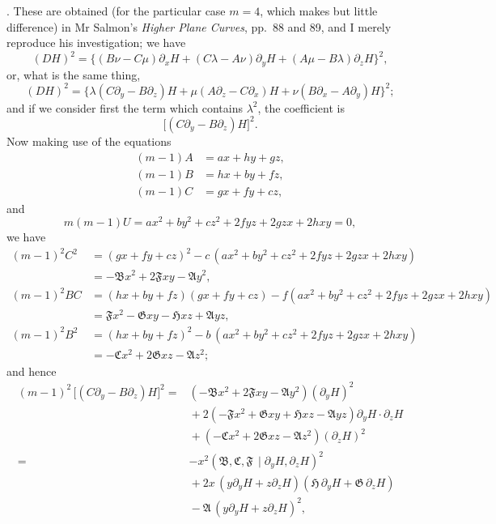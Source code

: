 \documentclass[11pt]{article}
\newcommand{\Cdel}{\mid}
\begin{document}
. These are obtained (for the particular case $m = 4$, which makes but little difference) in Mr Salmon's \textit{Higher Plane Curves}, pp.~88 and 89, and I merely reproduce his investigation; we have
\[
(DH)^2 = \bigl\{(B\nu - C\mu)\partial_x H + (C\lambda - A\nu)\partial_y H + (A\mu - B\lambda)\partial_z H\bigr\}^2,
\]
or, what is the same thing,
\[
(DH)^2 = \bigl\{\lambda(C\partial_y - B\partial_z)H + \mu(A\partial_z - C\partial_x)H + \nu(B\partial_x - A\partial_y)H\bigr\}^2;
\]
and if we consider first the term which contains $\lambda^2$, the coefficient is
\[
\bigl[(C\partial_y - B\partial_z)H\bigr]^2.
\]
Now making use of the equations
\[
\begin{aligned}
(m-1)A &= ax + hy + gz,\\
(m-1)B &= hx + by + fz,\\
(m-1)C &= gx + fy + cz,
\end{aligned}
\]
and
\[
m(m-1)U = ax^2 + by^2 + cz^2 + 2fyz + 2gzx + 2hxy = 0,
\]
we have
\[
\begin{aligned}
(m-1)^2 C^2 &= (gx + fy + cz)^2 - c\,(ax^2 + by^2 + cz^2 + 2fyz + 2gzx + 2hxy)\\
            &= -\mathfrak{B}x^2 + 2\mathfrak{F}xy - \mathfrak{A}y^2,\\[2pt]
(m-1)^2 BC &= (hx + by + fz)(gx + fy + cz) - f(ax^2 + by^2 + cz^2 + 2fyz + 2gzx + 2hxy)\\
            &= \mathfrak{F}x^2 - \mathfrak{G}xy - \mathfrak{H}xz + \mathfrak{A}yz,\\[2pt]
(m-1)^2 B^2 &= (hx + by + fz)^2 - b\,(ax^2 + by^2 + cz^2 + 2fyz + 2gzx + 2hxy)\\
            &= -\mathfrak{C}x^2 + 2\mathfrak{G}xz - \mathfrak{A}z^2;
\end{aligned}
\]
and hence
\[
\begin{aligned}
(m-1)^2\,\bigl[(C\partial_y - B\partial_z)H\bigr]^2 = {}& (-\mathfrak{B}x^2 + 2\mathfrak{F}xy - \mathfrak{A}y^2)(\partial_y H)^2\\
&{}+ 2(-\mathfrak{F}x^2 + \mathfrak{G}xy + \mathfrak{H}xz - \mathfrak{A}yz)\partial_y H \cdot \partial_z H\\
&{}+ (-\mathfrak{C}x^2 + 2\mathfrak{G}xz - \mathfrak{A}z^2)(\partial_z H)^2\\
={}& -x^2(\mathfrak{B}, \mathfrak{C}, \mathfrak{F}\,\Cdel\partial_y H, \partial_z H)^2\\
&{}+ 2x\,(y\partial_y H + z\partial_z H)(\mathfrak{H}\,\partial_y H + \mathfrak{G}\,\partial_z H)\\
&{}- \mathfrak{A}\,(y\partial_y H + z\partial_z H)^2,
\end{aligned}
\]
\end{document}

